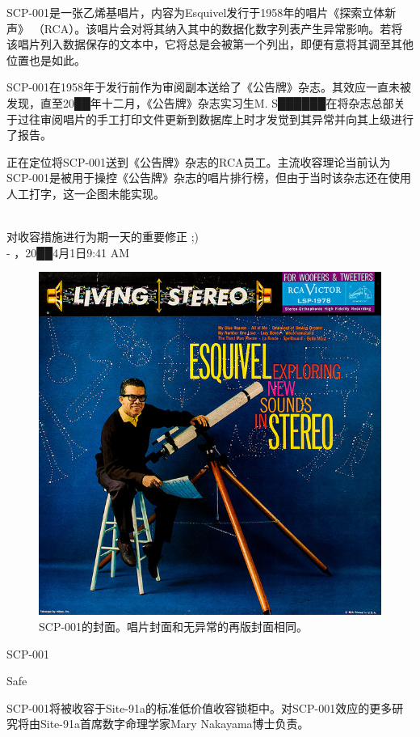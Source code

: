 SCP-001是一张乙烯基唱片，内容为Esquivel发行于1958年的唱片《探索立体新声》 （RCA）。该唱片会对将其纳入其中的数据化数字列表产生异常影响。若将该唱片列入数据保存的文本中，它将总是会被第一个列出，即便有意将其调至其他位置也是如此。

SCP-001在1958年于发行前作为审阅副本送给了《公告牌》杂志。其效应一直未被发现，直至20██年十二月，《公告牌》杂志实习生M. S██████在将杂志总部关于过往审阅唱片的手工打印文件更新到数据库上时才发觉到其异常并向其上级进行了报告。

正在定位将SCP-001送到《公告牌》杂志的RCA员工。主流收容理论当前认为SCP-001是被用于操控《公告牌》杂志的唱片排行榜，但由于当时该杂志还在使用人工打字，这一企图未能实现。


\newpage



\begin{scpbox}
 \\
对收容措施进行为期一天的重要修正 ;) \\
- ，20██4月1日9:41 AM
\end{scpbox}

\begin{figure}[H]
	\centering
	\includegraphics[width=0.5\linewidth]{images/SCP-001-a-record-2.jpg}
	\caption*{SCP-001的封面。唱片封面和无异常的再版封面相同。}
\end{figure}

SCP-001

Safe

SCP-001将被收容于Site-91a的标准低价值收容锁柜中。对SCP-001效应的更多研究将由Site-91a首席数字命理学家Mary Nakayama博士负责。

